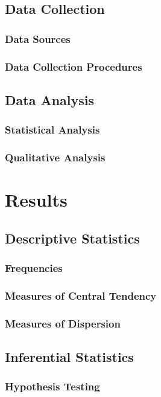 \documentclass[
    writingLanguage=english, 
    addPageTitle=on,
    addDeclaration=on,
    addMUSTlog=off,
    printing=off,
    refIndent=on,
    addFigTOC=on,
    addTabTOC=on,
]{.def/must}
\begin{document}
\section{Data Collection}
\subsection{Data Sources}
\subsection{Data Collection Procedures}
\section{Data Analysis}
\subsection{Statistical Analysis}
\subsection{Qualitative Analysis}

\chapter{Results}
\section{Descriptive Statistics}
\subsection{Frequencies}
\subsection{Measures of Central Tendency}
\subsection{Measures of Dispersion}
\section{Inferential Statistics}
\subsection{Hypothesis Testing}
\end{document}
